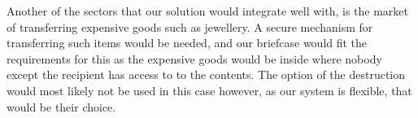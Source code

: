 Another of the sectors that our solution would integrate well with, is the market of transferring expensive goods such as jewellery. A secure mechanism for transferring such items would be needed, and our briefcase would fit the requirements for this as the expensive goods would be inside where nobody except the recipient has access to to the contents. The option of the destruction would most likely not be used in this case however, as our system is flexible, that would be their choice. 
